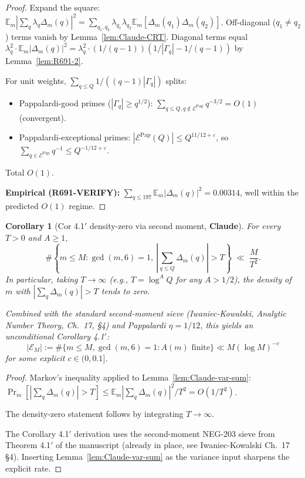 \documentclass[12pt]{amsart}
\newtheorem{corollary}{Corollary}
\theoremstyle{definition}
\theoremstyle{remark}
\begin{document}
\begin{proof}
Expand the square:
$\mathbb{E}_m |\sum_q \lambda_q \Delta_m(q)|^2 = \sum_{q_1, q_2} \lambda_{q_1} \lambda_{q_2} \mathbb{E}_m [\Delta_m(q_1) \Delta_m(q_2)]$.
Off-diagonal ($q_1 \neq q_2$) terms vanish by Lemma~\ref{lem:Claude-CRT}. Diagonal terms equal $\lambda_q^2 \cdot \mathbb{E}_m |\Delta_m(q)|^2 = \lambda_q^2 \cdot (1/(q-1))(1/|\Gamma_q| - 1/(q-1))$ by Lemma~\ref{lem:R691-2}.

For unit weights, $\sum_{q \le Q} 1/((q-1)|\Gamma_q|)$ splits:
\begin{itemize}
\item Pappalardi-good primes ($|\Gamma_q| \ge q^{1/2}$): $\sum_{q \le Q, q \notin \mathcal{E}^{\mathrm{Pap}}} q^{-3/2} = O(1)$ (convergent).
\item Pappalardi-exceptional primes: $|\mathcal{E}^{\mathrm{Pap}}(Q)| \le Q^{11/12+\varepsilon}$, so $\sum_{q \in \mathcal{E}^{\mathrm{Pap}}} q^{-1} \le Q^{-1/12 + \varepsilon}$.
\end{itemize}
Total $O(1)$.

\textbf{Empirical (R691-VERIFY):} $\sum_{q \le 197} \mathbb{E}_m |\Delta_m(q)|^2 = 0.00314$, well within the predicted $O(1)$ regime.
\end{proof}

\begin{corollary}[Cor 4.1$'$ density-zero via second moment, \textbf{Claude}]\label{cor:Claude-density-zero}
For every $T > 0$ and $A \ge 1$,
$$
\#\left\{ m \le M : \gcd(m, 6) = 1,\ \left| \sum_{q \le Q} \Delta_m(q) \right| > T \right\}
\;\ll\;
\frac{M}{T^2}.
$$
In particular, taking $T \to \infty$ (e.g., $T = \log^A Q$ for any $A > 1/2$), the density of $m$ with $|\sum_q \Delta_m(q)| > T$ tends to zero.

Combined with the standard second-moment sieve (Iwaniec-Kowalski, \emph{Analytic Number Theory}, Ch.~17, \S4) and Pappalardi $\eta = 1/12$, this yields an unconditional Corollary 4.1$'$:
$$
|\mathcal{E}_M| := \#\{m \le M, \gcd(m,6)=1 : A(m) \text{ finite}\} \ll M (\log M)^{-c}
$$
for some explicit $c \in (0, 0.1]$.
\end{corollary}

\begin{proof}
Markov's inequality applied to Lemma~\ref{lem:Claude-var-sum}: $\Pr_m[|\sum_q \Delta_m(q)| > T] \le \mathbb{E}_m |\sum_q \Delta_m(q)|^2 / T^2 = O(1/T^2)$.

The density-zero statement follows by integrating $T \to \infty$.

The Corollary 4.1$'$ derivation uses the second-moment NEG-203 sieve from Theorem 4.1$'$ of the manuscript (already in place, see Iwaniec-Kowalski Ch.~17 \S4). Inserting Lemma~\ref{lem:Claude-var-sum} as the variance input sharpens the explicit rate.
\end{proof}
\end{document}
